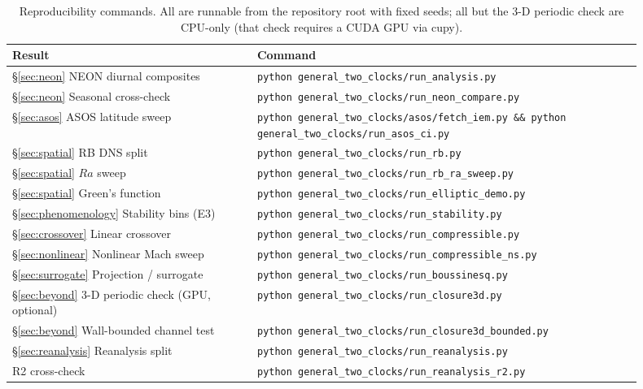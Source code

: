 \documentclass[11pt]{article}
\begin{document}
\begin{table}[h]
\centering
\caption{Reproducibility commands. All are runnable from the repository root with fixed seeds; all but the 3-D periodic check are CPU-only (that check requires a CUDA GPU via cupy).}
\label{tab:commands}
\small
\begin{tabular}{p{0.35\linewidth}p{0.55\linewidth}}
\toprule
Result & Command \\
\midrule
\S\ref{sec:neon} NEON diurnal composites &
\texttt{python general\_two\_clocks/\allowbreak run\_analysis.py} \\
\S\ref{sec:neon} Seasonal cross-check &
\texttt{python general\_two\_clocks/\allowbreak run\_neon\_compare.py} \\
\S\ref{sec:asos} ASOS latitude sweep &
\texttt{python general\_two\_clocks/asos/\allowbreak fetch\_iem.py \&\&
python general\_two\_clocks/\allowbreak run\_asos\_ci.py} \\
\S\ref{sec:spatial} RB DNS split &
\texttt{python general\_two\_clocks/\allowbreak run\_rb.py} \\
\S\ref{sec:spatial} $Ra$ sweep &
\texttt{python general\_two\_clocks/\allowbreak run\_rb\_ra\_sweep.py} \\
\S\ref{sec:spatial} Green's function &
\texttt{python general\_two\_clocks/\allowbreak run\_elliptic\_demo.py} \\
\S\ref{sec:phenomenology} Stability bins (E3) &
\texttt{python general\_two\_clocks/\allowbreak run\_stability.py} \\
\S\ref{sec:crossover} Linear crossover &
\texttt{python general\_two\_clocks/\allowbreak run\_compressible.py} \\
\S\ref{sec:nonlinear} Nonlinear Mach sweep &
\texttt{python general\_two\_clocks/\allowbreak run\_compressible\_ns.py} \\
\S\ref{sec:surrogate} Projection / surrogate &
\texttt{python general\_two\_clocks/\allowbreak run\_boussinesq.py} \\
\S\ref{sec:beyond} 3-D periodic check (GPU, optional) &
\texttt{python general\_two\_clocks/\allowbreak run\_closure3d.py} \\
\S\ref{sec:beyond} Wall-bounded channel test &
\texttt{python general\_two\_clocks/\allowbreak run\_closure3d\_bounded.py} \\
\S\ref{sec:reanalysis} Reanalysis split &
\texttt{python general\_two\_clocks/\allowbreak run\_reanalysis.py} \\
R2 cross-check &
\texttt{python general\_two\_clocks/\allowbreak run\_reanalysis\_r2.py} \\
\bottomrule
\end{tabular}
\end{table}
\end{document}
